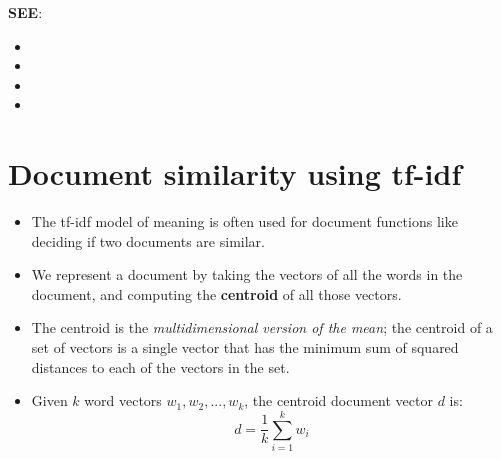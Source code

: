 \noindent \textbf{SEE}:
\begin{itemize}
    \item {}
    \item {}
    \item {}
    \item {}
\end{itemize}


\section{Document similarity using tf-idf}
\begin{itemize}
    \item The tf-idf model of meaning is often used for document functions like deciding if two documents are similar.

    \item We represent a document by taking the vectors of all the words in the document, and computing the \textbf{centroid} of all those vectors.
    
    \item The centroid is the \textit{multidimensional version of the mean}; the centroid of a set of vectors is a single vector that has the minimum sum of squared distances to each of the vectors in the set.

    \item Given $k$ word vectors $w_1,w_2,...,w_k$, the centroid document vector $d$ is:
    \[
        \displaystyle d = \dfrac{1}{k}\displaystyle\sum_{i=1}^{k} w_i
    \]

    

\end{itemize}


































